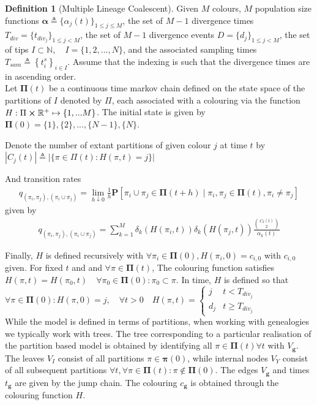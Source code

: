 \documentclass{report}
\newcommand{\R}{\mathbb{R}}
\newcommand{\N}{\mathbb{N}}
\theoremstyle{definition}
\newtheorem{definition}{Definition}[section]
\begin{document}
\begin{definition}[Multiple Lineage Coalescent]\label{def:model}
Given $M$ colours, $M$ population size functions $\mathbf{\alpha}\triangleq\{\alpha_j(t)\}_{1\leq j\leq M}$, the set of $M-1$ divergence times $T_{div} = \{t_{div_j}\}_{1\leq j<M}$, the set of $M-1$ divergence events $D = \{d_j\}_{1\leq j<M}$, the set of tips $I\subset \N, \quad I=\{1,2,...,N\}$, and the associated sampling times $T_{sam}\triangleq \left\{t^s_i\right\}_{i \in I}$.
Assume that the indexing is such that the divergence times are in ascending order.\\
Let $\pmb\Pi(t)$ be a continuous time markov chain defined on the state space of the partitions of $I$ denoted by $\Pi$, each associated with a colouring via the function $H: \Pi\cross\R^+ \mapsto \{1,...M\}$. The initial state is given by $\pmb\Pi(0) = \{1\}, \{2\}, ... , \{N-1\}, \{N\}$.

Denote the number of extant partitions of given colour $j$ at time $t$ by $|C_j(t)| \triangleq |\{\pi \in \Pi(t) : H(\pi, t) = j \}|$

And transition rates
\begin{gather}\label{eq:transitions}
q_{(\pi_i,\pi_j), (\pi_i\cup\pi_j)}=\lim\limits_{h \downarrow 0}\frac{1}{h}\mathbf{P}\left[\pi_i \cup \pi_j \in \pmb\Pi(t+h)\mid \pi_i, \pi_j \in \pmb\Pi(t), \pi_i \neq \pi_j \right]  
\end{gather}
given by
\begin{gather}\label{eq:rates}
q_{(\pi_i,\pi_j), (\pi_i\cup\pi_j)} = \sum\limits_{k=1}^{M} \delta_k(H(\pi_i,t))\delta_k(H(\pi_j,t))\frac{\binom{C_k(t)}{2}}{\alpha_k(t)}
\end{gather}
\end{definition}
Finally, $H$ is defined recursively with $\forall \pi_i \in \pmb\Pi(0), H(\pi_i,0) = c_{i,0}$ with $c_{i,0}$ given. For fixed $t$ and and $\forall \pi \in \pmb\Pi(t)$, The colouring function satisfies $H(\pi, t) = H(\pi_0,t)\quad \forall \pi_0 \in \pmb\Pi(0) : \pi_0 \subset \pi$. In time, $H$ is defined so that $\forall \pi \in \pmb\Pi(0) : H(\pi,0) = j,\quad \forall t>0 \quad H(\pi, t) = \begin{cases} 
      j & t < T_{div_j} \\
      d_j & t \geq T_{div_j}
   \end{cases}$\\
   
While the model is defined in terms of partitions, when working with genealogies we typically work with trees. The tree corresponding to a particular realisation of the partition based model is obtained by identifying all $\pi \in \pmb\Pi(t)\forall t$ with $V_\mathbf{g}$. The leaves $V_I$ consist of all partitions $\pi \in \pmb\pi(0)$, while internal nodes $V_Y$ consist of all subsequent partitions $\forall t, \forall\pi\in \pmb\Pi(t) : \pi \notin \pmb\Pi(0)$. The edges $V_\mathbf{g}$ and times $t_\mathbf{g}$ are given by the jump chain. The colouring $c_\mathbf{g}$ is obtained through the colouring function $H$. 
\end{document}
